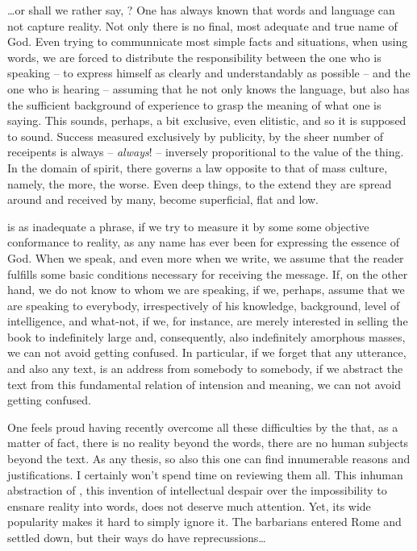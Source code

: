 { 
\ldots or shall we rather say, ?  
One has always known that words and language
can not capture reality.  Not only there is no final, most adequate
and true name of God.  Even trying to communnicate most simple facts
and situations, when using words, we are forced to distribute the
responsibility between the one who is speaking -- to express himself
as clearly and understandably as possible -- and the one who is
hearing -- assuming that he not only knows the language, but also has
the sufficient background of experience to grasp the meaning of what
one is saying.  This sounds, perhaps, a bit exclusive, even elitistic,
and so it is supposed to sound.   Success measured exclusively by publicity, by the
sheer number of receipents is always -- {\em always}!  -- inversely
proporitional to the value of the thing.  In the domain of spirit,
there governs a law opposite to that of mass culture, namely, the
more, the worse.  Even deep things, to the extend they are spread
around and received by many, become superficial, flat and low.

 is as
inadequate a phrase, if we try to measure it by some some objective
conformance to reality, as any name has ever been for expressing the
essence of God. When we speak, and even more when we write, we assume 
that the reader fulfills some basic conditions necessary for 
receiving the message. If, on the other hand, we do not know to whom 
we are speaking, if we, perhaps, assume that we are speaking to 
everybody, irrespectively of his knowledge, background, level of 
intelligence, and what-not, if we, for instance, are merely interested 
in selling the book to indefinitely large and, consequently, also 
indefinitely amorphous masses, we can not avoid getting confused. In 
particular, if we forget that any utterance, and also any text, is an 
address from somebody to somebody, if we abstract the text from this 
fundamental relation of intension and meaning, we can not avoid 
getting confused. 

\pa
One feels proud having recently overcome all these difficulties by
the  that, as a matter of fact, there is no reality 
beyond the words, there are no human subjects beyond the text. As any 
thesis, so also this one can find innumerable reasons and 
justifications. I certainly won't spend time on reviewing them all. 
This inhuman abstraction of , this invention of 
intellectual despair over the impossibility to ensnare reality into 
words, does not deserve much attention. Yet, its wide 
popularity makes it hard to simply ignore it. The barbarians entered 
Rome and settled down, but their ways do have reprecussions\ldots

}
